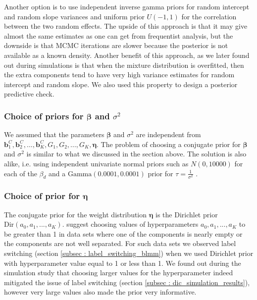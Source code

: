 Another option is to use independent inverse gamma priors for random intercept and random slope variances and uniform prior $U(-1,1)$ for the correlation between the two random effects. The upside of this approach is that it may give almost the same estimates as one can get from frequentist analysis, but the downside is that MCMC iterations are slower because the posterior is not available as a known density. Another benefit of this approach, as we later found out during simulations is that when the mixture distribution is overfitted, then the extra components tend to have very high variance estimates for random intercept and random slope. We also used this property to design a posterior predictive check.

\subsubsection{Choice of priors for $\boldsymbol{\beta}$ and $\sigma^2$}
We assumed that the parameters $\boldsymbol{\beta}$ and $\sigma^2$ are independent from $\boldsymbol{b}_1^C, \boldsymbol{b}_2^C, ..., \boldsymbol{b}_K^C, G_1, G_2, ..., G_K, \boldsymbol{\eta}$. The problem of choosing a conjugate prior for $\boldsymbol{\beta}$ and $\sigma^2$ is similar to what we discussed in the section above. The solution is also alike, i.e. using independent univariate normal priors such as $N(0, 10000)$ for each of the $\beta_d$ and a $\text{Gamma}(0.0001, 0.0001)$ prior for $\tau = \frac 1 {\sigma^2}$ \citep[chap. 17]{gelman_data_2006}.

\subsubsection{Choice of prior for $\boldsymbol{\eta}$}
The conjugate prior for the weight distribution $\boldsymbol{\eta}$ is the Dirichlet prior $\text{Dir}(a_0, a_1,..., a_K)$. \citet[pg. 105]{fruhwirth-schnatter_finite_2013} suggest choosing values of hyperparameters $a_0, a_1,..., a_K$ to be greater than 1 in data sets where one of the components is nearly empty or the components are not well separated. For such data sets we observed label switching (section \ref{subsec : label_switching_blmm}) when we used Dirichlet prior with hyperparameter value equal to 1 or less than 1. We found out during the simulation study that choosing larger values for the hyperparameter indeed mitigated the issue of label switching (section \ref{subsec : dic_simulation_results}), however very large values also made the prior very informative.

